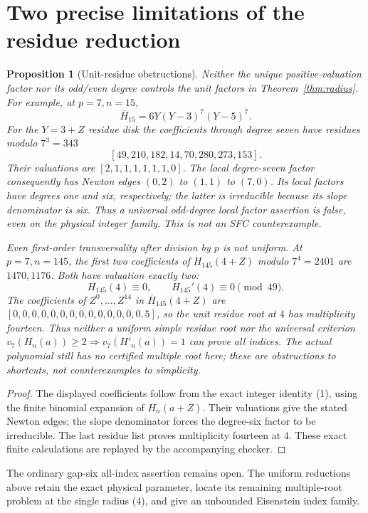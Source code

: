 \documentclass[11pt]{article}
\newtheorem{proposition}[theorem]{Proposition}
\begin{document}
\section*{Two precise limitations of the residue reduction}
\begin{proposition}[Unit-residue obstructions]\label{prop:local-obstructions}
Neither the unique positive-valuation factor nor its odd/even
degree controls the unit factors in Theorem~\ref{thm:radius}.
For example, at $p=7,n=15$,
\[
 \overline H_{15}=6Y(Y-3)^7(Y-5)^7.
\]
For the $Y=3+Z$ residue disk the coefficients through degree seven
have residues modulo $7^3=343$
\[
 [49,210,182,14,70,280,273,153].
\]
Their valuations are $[2,1,1,1,1,1,1,0]$.
The local degree-seven factor consequently has Newton edges
$(0,2)$ to $(1,1)$ to $(7,0)$. Its local factors have degrees
one and six, respectively; the latter is irreducible because
its slope denominator is six. Thus a universal odd-degree local
factor assertion is false, even on the physical integer family.
This is not an SFC counterexample.

Even first-order transversality after division by $p$ is not
uniform. At $p=7,n=145$, the first two coefficients of
$H_{145}(4+Z)$ modulo $7^4=2401$ are $1470,1176$.
Both have valuation exactly two:
\[
 H_{145}(4)\equiv0,\qquad H_{145}'(4)\equiv0\pmod {49}.
\]
The coefficients of $Z^0,\ldots,Z^{14}$ in
$\overline H_{145}(4+Z)$ are
$[0,0,0,0,0,0,0,0,0,0,0,0,0,0,5]$,
so the unit residue root at $4$ has multiplicity fourteen. Thus neither a uniform simple residue root
nor the universal criterion
$v_7(H_n(a))\ge2\Rightarrow v_7(H'_n(a))=1$
can prove all indices. The actual polynomial still has no
certified multiple root here; these are obstructions to shortcuts,
not counterexamples to simplicity.

\end{proposition}
\begin{proof}
The displayed coefficients follow from the exact integer identity (1),
using the finite binomial expansion of $H_n(a+Z)$. Their
valuations give the stated Newton edges; the slope denominator
forces the degree-six factor to be irreducible. The last residue
list proves multiplicity fourteen at $4$. These exact finite
calculations are replayed by the accompanying checker.
\end{proof}

The ordinary gap-six all-index assertion remains open.
The uniform reductions above retain the exact physical
parameter, locate its remaining multiple-root problem at the
single radius (4), and give an unbounded Eisenstein index family.
\end{document}
